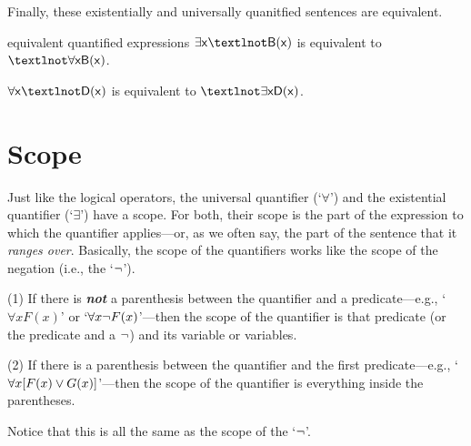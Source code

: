 Finally, these existentially and universally quanitfied sentences are equivalent.
\begin{factboxy-width}[width=8cm]{equivalent quantified expressions}
$\exists \meta{x} ¬\meta{B(x)} $ is equivalent to $¬\forall \meta{x B(x)}$.\medskip

$\forall \meta{x} ¬\meta{D(x)}$ is equivalent to $¬\exists \meta{x D(x)}$.
\end{factboxy-width}


\section{Scope}

Just like the logical operators, the universal quantifier (`$\forall$’) and the existential quantifier (`$\exists$’) have a scope. For both, their scope is the part of the expression to which the quantifier applies---or, as we often say, the part of the sentence that it \textit{ranges over}. Basically, the scope of the quantifiers works like the scope of the negation (i.e., the `${\neg}$’). 

\begin{ebullet}
\item[(1)] If there is \textit\textbf{not} a parenthesis between the quantifier and a predicate---e.g., `$\forall xF(x)$’ or `$\forall x {\neg} F(x)$’---then the scope of the quantifier is that predicate (or the predicate and a ${\neg}$) and its variable or variables.\smallskip
\item[(2)] If there is a parenthesis between the quantifier and the first predicate---e.g., `$\forall x[F(x) \vee G(x)]$’---then the scope of the quantifier is everything inside the parentheses.\smallskip
\item[] Notice that this is all the same as the scope of the `${\neg}$’.
\end{ebullet}
